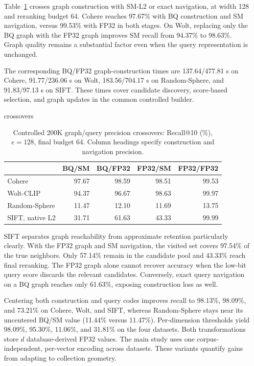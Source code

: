 Table~\ref{tab:cross} crosses graph construction with SM-L2 or exact navigation, at width 128 and reranking budget 64. Cohere reaches 97.67\% with BQ construction and SM navigation, versus 99.53\% with FP32 in both stages. On Wolt, replacing only the BQ graph with the FP32 graph improves SM recall from 94.37\% to 98.63\%. Graph quality remains a substantial factor even when the query representation is unchanged.

The corresponding BQ/FP32 graph-construction times are 137.64/477.81 s on Cohere, 91.77/236.06 s on Wolt, 183.56/704.17 s on Random-Sphere, and 91.83/97.13 s on SIFT. These times cover candidate discovery, score-based selection, and graph updates in the common controlled builder.

\begin{table}[t]
\caption{Controlled 200K graph/query precision crossovers: Recall@10 (\%), $e=128$, final budget 64. Column headings specify construction and navigation precision.}
\label{tab:cross}
\centering
\small
\setlength{\tabcolsep}{3pt}
\begin{quivercheckedtable}{crossovers}
\begin{tabular}{lrrrr}
\toprule
& BQ/SM & BQ/FP32 & FP32/SM & FP32/FP32\\
\midrule
Cohere & 97.67 & 98.59 & 98.51 & 99.53\\
Wolt-CLIP & 94.37 & 96.67 & 98.63 & 99.97\\
Random-Sphere & 11.47 & 12.10 & 11.69 & 13.75\\
SIFT, native L2 & 31.71 & 61.63 & 43.33 & 99.99\\
\bottomrule
\end{tabular}
\end{quivercheckedtable}
\end{table}

SIFT separates graph reachability from approximate retention particularly clearly. With the FP32 graph and SM navigation, the visited set covers 97.54\% of the true neighbors. Only 57.14\% remain in the candidate pool and 43.33\% reach final reranking. The FP32 graph alone cannot recover accuracy when the low-bit query score discards the relevant candidates. Conversely, exact query navigation on a BQ graph reaches only 61.63\%, exposing construction loss as well.

Centering both construction and query codes improves recall to 98.13\%, 98.09\%, and 73.21\% on Cohere, Wolt, and SIFT, whereas Random-Sphere stays near its uncentered BQ/SM value (11.44\% versus 11.47\%). Per-dimension thresholds yield 98.09\%, 95.30\%, 11.06\%, and 31.81\% on the four datasets. Both transformations store $d$ database-derived FP32 values. The main study uses one corpus-independent, per-vector encoding across datasets. These variants quantify gains from adapting to collection geometry.

